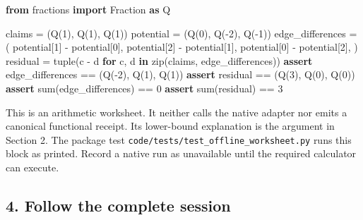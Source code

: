 \documentclass[
  11pt,
]{article}
\newenvironment{Shaded}{}{}
\newcommand{\BuiltInTok}[1]{\textcolor[rgb]{0.00,0.50,0.00}{#1}}
\newcommand{\ControlFlowTok}[1]{\textcolor[rgb]{0.00,0.44,0.13}{\textbf{#1}}}
\newcommand{\DecValTok}[1]{\textcolor[rgb]{0.25,0.63,0.44}{#1}}
\newcommand{\ImportTok}[1]{\textcolor[rgb]{0.00,0.50,0.00}{\textbf{#1}}}
\newcommand{\KeywordTok}[1]{\textcolor[rgb]{0.00,0.44,0.13}{\textbf{#1}}}
\newcommand{\NormalTok}[1]{#1}
\newcommand{\OperatorTok}[1]{\textcolor[rgb]{0.40,0.40,0.40}{#1}}
\begin{document}
\begin{Shaded}
\begin{Highlighting}[]
\ImportTok{from}\NormalTok{ fractions }\ImportTok{import}\NormalTok{ Fraction }\ImportTok{as}\NormalTok{ Q}

\NormalTok{claims }\OperatorTok{=}\NormalTok{ (Q(}\DecValTok{1}\NormalTok{), Q(}\DecValTok{1}\NormalTok{), Q(}\DecValTok{1}\NormalTok{))}
\NormalTok{potential }\OperatorTok{=}\NormalTok{ (Q(}\DecValTok{0}\NormalTok{), Q(}\OperatorTok{{-}}\DecValTok{2}\NormalTok{), Q(}\OperatorTok{{-}}\DecValTok{1}\NormalTok{))}
\NormalTok{edge\_differences }\OperatorTok{=}\NormalTok{ (}
\NormalTok{    potential[}\DecValTok{1}\NormalTok{] }\OperatorTok{{-}}\NormalTok{ potential[}\DecValTok{0}\NormalTok{],}
\NormalTok{    potential[}\DecValTok{2}\NormalTok{] }\OperatorTok{{-}}\NormalTok{ potential[}\DecValTok{1}\NormalTok{],}
\NormalTok{    potential[}\DecValTok{0}\NormalTok{] }\OperatorTok{{-}}\NormalTok{ potential[}\DecValTok{2}\NormalTok{],}
\NormalTok{)}
\NormalTok{residual }\OperatorTok{=} \BuiltInTok{tuple}\NormalTok{(c }\OperatorTok{{-}}\NormalTok{ d }\ControlFlowTok{for}\NormalTok{ c, d }\KeywordTok{in} \BuiltInTok{zip}\NormalTok{(claims, edge\_differences))}
\ControlFlowTok{assert}\NormalTok{ edge\_differences }\OperatorTok{==}\NormalTok{ (Q(}\OperatorTok{{-}}\DecValTok{2}\NormalTok{), Q(}\DecValTok{1}\NormalTok{), Q(}\DecValTok{1}\NormalTok{))}
\ControlFlowTok{assert}\NormalTok{ residual }\OperatorTok{==}\NormalTok{ (Q(}\DecValTok{3}\NormalTok{), Q(}\DecValTok{0}\NormalTok{), Q(}\DecValTok{0}\NormalTok{))}
\ControlFlowTok{assert} \BuiltInTok{sum}\NormalTok{(edge\_differences) }\OperatorTok{==} \DecValTok{0}
\ControlFlowTok{assert} \BuiltInTok{sum}\NormalTok{(residual) }\OperatorTok{==} \DecValTok{3}
\end{Highlighting}
\end{Shaded}

This is an arithmetic worksheet. It neither calls the native adapter nor
emits a canonical functional receipt. Its lower-bound explanation is the
argument in Section 2. The package test
\texttt{code/tests/test\_offline\_worksheet.py} runs this block as
printed. Record a native run as unavailable until the required
calculator can execute.

\hypertarget{follow-the-complete-session}{%
\subsection{4. Follow the complete
session}\label{follow-the-complete-session}}
\end{document}
